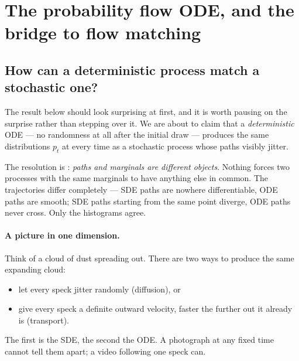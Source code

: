 \documentclass[11pt,a4paper]{report}
\theoremstyle{definition}
\theoremstyle{remark}
\begin{document}
\section{The probability flow ODE, and the bridge to flow matching}
\label{sec:pf-ode-scratch}

\subsection{How can a deterministic process match a stochastic one?}
\label{sec:pf-ode-motivation}

The result below should look surprising at first, and it is worth pausing on
the surprise rather than stepping over it. We are about to claim that a
\emph{deterministic} ODE --- no randomness at all after the initial draw ---
produces the same distributions $p_t$ at every time as a stochastic
process whose paths visibly jitter.

The resolution is : \emph{paths and
marginals are different objects}. Nothing forces two processes with the same
marginals to have anything else in common. The trajectories differ
completely --- SDE paths are nowhere differentiable, ODE paths are smooth;
SDE paths starting from the same point diverge, ODE paths never cross.
Only the histograms agree.

\paragraph{A picture in one dimension.} Think of a cloud of dust spreading
out. There are two ways to produce the same expanding cloud:
\begin{itemize}
\item let every speck jitter randomly (diffusion), or
\item give every speck a definite outward velocity, faster the further out
      it already is (transport).
\end{itemize}
The first is the SDE, the second the ODE. A photograph at any fixed time
cannot tell them apart; a video following one speck can.
\end{document}
